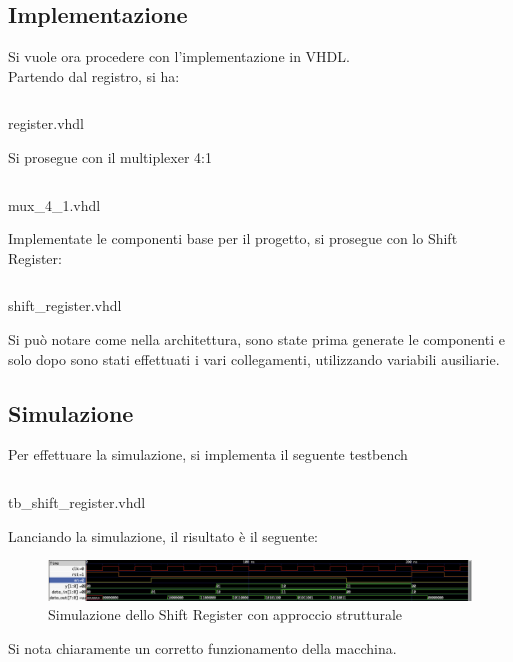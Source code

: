 \subsection{Implementazione}
Si vuole ora procedere con l'implementazione in VHDL.\\
Partendo dal registro, si ha:
\begin{code}
    \inputminted[frame=lines, framesep=2mm, baselinestretch=1.2, bgcolor=LightGray, fontsize=\footnotesize, linenos]{vhdl}{vhdl_files/Cap_4/register.vhdl}
    \caption{register.vhdl}
    \label{lst:rgt_one_bit}
\end{code}
\noindent Si prosegue con il multiplexer 4:1
\begin{code}
    \inputminted[frame=lines, framesep=2mm, baselinestretch=1.2, bgcolor=LightGray, fontsize=\footnotesize, linenos]{vhdl}{vhdl_files/Cap_4/mux_4_1.vhdl}
    \caption{mux\_4\_1.vhdl}
    \label{lst:mux_4_1_sr}
\end{code}
\noindent Implementate le componenti base per il progetto, si prosegue con lo Shift Register:
\begin{code}
    \inputminted[frame=lines, framesep=2mm, baselinestretch=1.2, bgcolor=LightGray, fontsize=\footnotesize, linenos]{vhdl}{vhdl_files/Cap_4/shift_register.vhdl}
    \caption{shift\_register.vhdl}
    \label{lst:sr_s}
\end{code}
Si può notare come nella architettura, sono state prima generate le componenti e solo dopo sono stati effettuati i vari collegamenti, utilizzando variabili ausiliarie.

\subsection{Simulazione}
Per effettuare la simulazione, si implementa il seguente testbench
\begin{code}
    \inputminted[frame=lines, framesep=2mm, baselinestretch=1.2, bgcolor=LightGray, fontsize=\footnotesize, linenos]{vhdl}{vhdl_files/Cap_4/tb_shift_register.vhdl}
    \caption{tb\_shift\_register.vhdl}
    \label{lst:tb_sr}
\end{code}
Lanciando la simulazione, il risultato è il seguente:
\begin{figure}[H]
	\centering
	\includegraphics[width=1\textwidth]{img/sim_shift_register_str.png}
	\caption{Simulazione dello Shift Register con approccio strutturale}
	\label{sim_sr_str} 
\end{figure}
Si nota chiaramente un corretto funzionamento della macchina.


